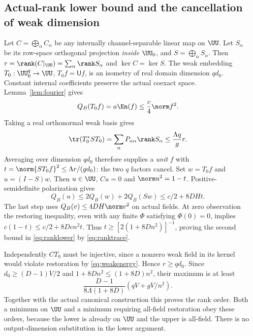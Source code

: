 \subsection{Actual-rank lower bound and the cancellation of weak dimension}
Let $C=\bigoplus_\alpha C_\alpha$ be any internally channel-separable linear
map on $\UU$. Let $S_\alpha$ be its row-space orthogonal projection
\emph{inside} $\UU_0$, and $S=\bigoplus_\alpha S_\alpha$. Then
$r=\rank(C|_\UU)=\sum_\alpha\rank S_\alpha$ and $\ker C=\ker S$.
The weak embedding $T_0:\UU_0^q\to\UU$, $T_0f=\mathsf U f$, is an isometry
of real domain dimension $qd_0$. Constant internal coefficients preserve the
actual coexact space. Lemma~\ref{lem:fourier} gives
\begin{equation}\label{eq:weakenergy}
 Q_B(T_0f)=a\En(f)\leq\frac c4\norm f^2.
\end{equation}
Taking a real orthonormal weak basis gives
\begin{equation}\label{eq:ranktrace}
 \tr(T_0^*ST_0)=\sum_\alpha P_{\alpha\alpha}\rank S_\alpha
       \leq\frac{\Lambda q}{g}r.
\end{equation}
Averaging over dimension $qd_0$ therefore supplies a \emph{unit} $f$ with
$t=\norm{ST_0f}^2\leq\Lambda r/(gd_0)$: the two $q$ factors cancel.
Set $w=T_0f$ and $u=(I-S)w$. Then $u\in\UU$, $Cu=0$ and
$\norm u^2=1-t$. Positive-semidefinite polarization gives
\[
 Q_B(u)\leq2Q_B(w)+2Q_B(Sw)\leq c/2+8DHt.
\]
The last step uses $Q_B(v)\leq4DH\norm v^2$ on actual fields.
At zero observation the restoring inequality, even with any finite
$\Phi$ satisfying $\Phi(0)=0$, implies
$c(1-t)\leq c/2+8Dcn^2t$. Thus
$t\geq[2(1+8Dn^2)]^{-1}$, proving the second bound in
\eqref{eq:ranklower} by \eqref{eq:ranktrace}.

Independently $CT_0$ must be injective, since a nonzero weak field in its
kernel would violate restoration by \eqref{eq:weakenergy}. Hence $r\geq qd_0$.
Since $d_0\geq(D-1)V/2$ and
$1+8Dn^2\leq(1+8D)n^2$, their maximum is at least
\[
 \frac{D-1}{8\Lambda(1+8D)}(qV+gV/n^2).
\]
Together with the actual canonical construction this proves the rank order.
Both a minimum on $\UU$ and a minimum requiring all-field restoration obey
these orders, because the lower is already on $\UU$ and the upper is all-field.
There is no output-dimension substitution in the lower argument.

